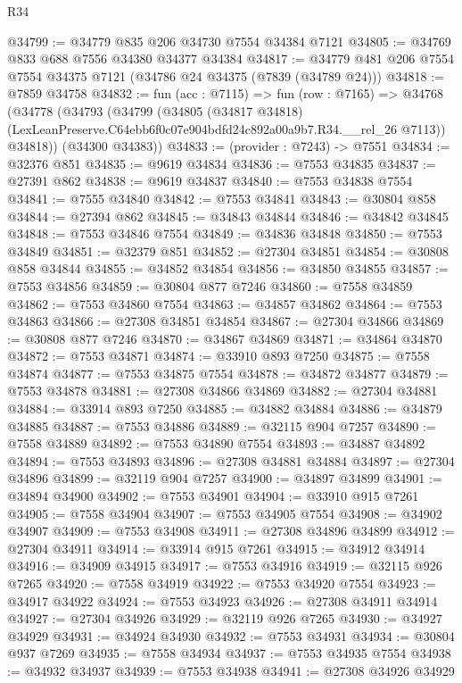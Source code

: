 \begin{lexlean}{R34}
\begin{coremodule}
@34799 := @34779 @835 @206 @34730 @7554 @34384 @7121
@34805 := @34769 @833 @688 @7556 @34380 @34377 @34384
@34817 := @34779 @481 @206 @7554 @7554 @34375 @7121 (@34786 @24 @34375 (@7839 (@34789 @24)))
@34818 := @7859 @34758
@34832 := fun (acc : @7115) =>
  fun (row : @7165) =>
  @34768
    (@34778
      (@34793
        (@34799
          (@34805
            (@34817 @34818)
            (LexLeanPreserve.C64ebb6f0c07e904bdfd24c892a00a9b7.R34.__rel_26 @7113))
          @34818))
      (@34300 @34383))
@34833 := (provider : @7243) -> @7551
@34834 := @32376 @851
@34835 := @9619 @34834
@34836 := @7553 @34835
@34837 := @27391 @862
@34838 := @9619 @34837
@34840 := @7553 @34838 @7554
@34841 := @7555 @34840
@34842 := @7553 @34841
@34843 := @30804 @858
@34844 := @27394 @862
@34845 := @34843 @34844
@34846 := @34842 @34845
@34848 := @7553 @34846 @7554
@34849 := @34836 @34848
@34850 := @7553 @34849
@34851 := @32379 @851
@34852 := @27304 @34851
@34854 := @30808 @858 @34844
@34855 := @34852 @34854
@34856 := @34850 @34855
@34857 := @7553 @34856
@34859 := @30804 @877 @7246
@34860 := @7558 @34859
@34862 := @7553 @34860 @7554
@34863 := @34857 @34862
@34864 := @7553 @34863
@34866 := @27308 @34851 @34854
@34867 := @27304 @34866
@34869 := @30808 @877 @7246
@34870 := @34867 @34869
@34871 := @34864 @34870
@34872 := @7553 @34871
@34874 := @33910 @893 @7250
@34875 := @7558 @34874
@34877 := @7553 @34875 @7554
@34878 := @34872 @34877
@34879 := @7553 @34878
@34881 := @27308 @34866 @34869
@34882 := @27304 @34881
@34884 := @33914 @893 @7250
@34885 := @34882 @34884
@34886 := @34879 @34885
@34887 := @7553 @34886
@34889 := @32115 @904 @7257
@34890 := @7558 @34889
@34892 := @7553 @34890 @7554
@34893 := @34887 @34892
@34894 := @7553 @34893
@34896 := @27308 @34881 @34884
@34897 := @27304 @34896
@34899 := @32119 @904 @7257
@34900 := @34897 @34899
@34901 := @34894 @34900
@34902 := @7553 @34901
@34904 := @33910 @915 @7261
@34905 := @7558 @34904
@34907 := @7553 @34905 @7554
@34908 := @34902 @34907
@34909 := @7553 @34908
@34911 := @27308 @34896 @34899
@34912 := @27304 @34911
@34914 := @33914 @915 @7261
@34915 := @34912 @34914
@34916 := @34909 @34915
@34917 := @7553 @34916
@34919 := @32115 @926 @7265
@34920 := @7558 @34919
@34922 := @7553 @34920 @7554
@34923 := @34917 @34922
@34924 := @7553 @34923
@34926 := @27308 @34911 @34914
@34927 := @27304 @34926
@34929 := @32119 @926 @7265
@34930 := @34927 @34929
@34931 := @34924 @34930
@34932 := @7553 @34931
@34934 := @30804 @937 @7269
@34935 := @7558 @34934
@34937 := @7553 @34935 @7554
@34938 := @34932 @34937
@34939 := @7553 @34938
@34941 := @27308 @34926 @34929

\end{coremodule}
\end{lexlean}
